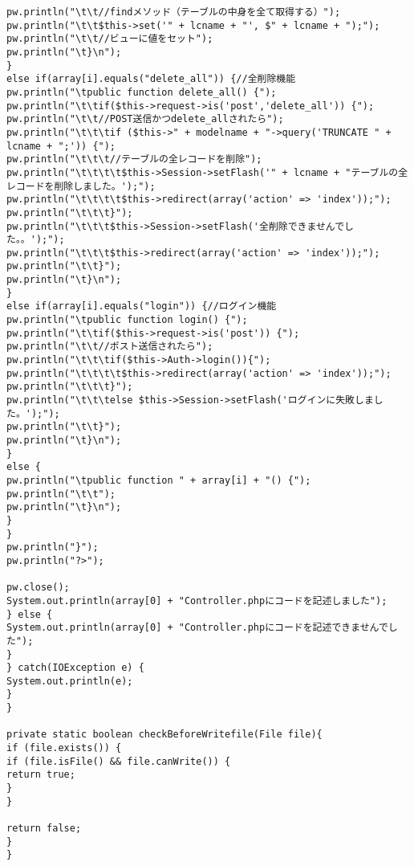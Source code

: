 \documentclass{funthesis}
\begin{document}
\begin{lstlisting}[caption=WriteController .java,label=1]
pw.println("\t\t//findメソッド（テーブルの中身を全て取得する）");
pw.println("\t\t$this->set('" + lcname + "', $" + lcname + ");");
pw.println("\t\t//ビューに値をセット");
pw.println("\t}\n");
}
else if(array[i].equals("delete_all")) {//全削除機能
pw.println("\tpublic function delete_all() {");
pw.println("\t\tif($this->request->is('post','delete_all')) {");
pw.println("\t\t//POST送信かつdelete_allされたら");
pw.println("\t\t\tif ($this->" + modelname + "->query('TRUNCATE " + lcname + ";')) {");
pw.println("\t\t\t//テーブルの全レコードを削除");
pw.println("\t\t\t\t$this->Session->setFlash('" + lcname + "テーブルの全レコードを削除しました。');");
pw.println("\t\t\t\t$this->redirect(array('action' => 'index'));");
pw.println("\t\t\t}");
pw.println("\t\t\t$this->Session->setFlash('全削除できませんでした。。');");
pw.println("\t\t\t$this->redirect(array('action' => 'index'));");
pw.println("\t\t}");
pw.println("\t}\n");
}
else if(array[i].equals("login")) {//ログイン機能
pw.println("\tpublic function login() {");
pw.println("\t\tif($this->request->is('post')) {");
pw.println("\t\t//ポスト送信されたら");
pw.println("\t\t\tif($this->Auth->login()){");
pw.println("\t\t\t\t$this->redirect(array('action' => 'index'));");
pw.println("\t\t\t}");
pw.println("\t\t\telse $this->Session->setFlash('ログインに失敗しました。');");
pw.println("\t\t}");
pw.println("\t}\n");
}
else {
pw.println("\tpublic function " + array[i] + "() {");
pw.println("\t\t");
pw.println("\t}\n");
}
}
pw.println("}");
pw.println("?>");

pw.close();
System.out.println(array[0] + "Controller.phpにコードを記述しました");
} else {
System.out.println(array[0] + "Controller.phpにコードを記述できませんでした");
}
} catch(IOException e) {
System.out.println(e);
}
}

private static boolean checkBeforeWritefile(File file){
if (file.exists()) {
if (file.isFile() && file.canWrite()) {
return true;
}
}

return false;
}
}
\end{lstlisting}　
\end{document}
